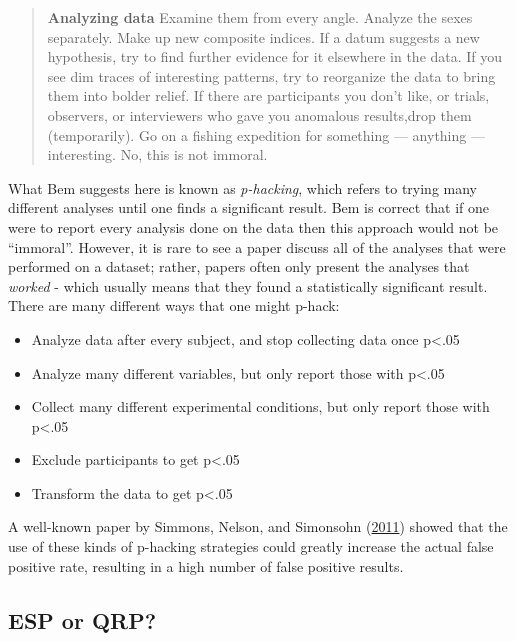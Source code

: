 \documentclass[12pt,]{book}
\providecommand{\tightlist}{%
  \setlength{\itemsep}{0pt}\setlength{\parskip}{0pt}}
\theoremstyle{definition}
\theoremstyle{definition}
\theoremstyle{definition}
\theoremstyle{remark}
\begin{document}
\begin{quote}
\textbf{Analyzing data} Examine them from every angle. Analyze the sexes separately. Make up new composite indices. If a datum suggests a new hypothesis, try to find further evidence for it elsewhere in the data. If you see dim traces of interesting patterns, try to reorganize the data to bring them into bolder relief. If there are participants you don't like, or trials, observers, or interviewers who gave you anomalous results,drop them (temporarily). Go on a fishing expedition for something --- anything --- interesting. No, this is not immoral.
\end{quote}

What Bem suggests here is known as \emph{p-hacking}, which refers to trying many different analyses until one finds a significant result. Bem is correct that if one were to report every analysis done on the data then this approach would not be ``immoral''. However, it is rare to see a paper discuss all of the analyses that were performed on a dataset; rather, papers often only present the analyses that \emph{worked} - which usually means that they found a statistically significant result. There are many different ways that one might p-hack:

\begin{itemize}
\tightlist
\item
  Analyze data after every subject, and stop collecting data once p\textless{}.05
\item
  Analyze many different variables, but only report those with p\textless{}.05
\item
  Collect many different experimental conditions, but only report those with p\textless{}.05
\item
  Exclude participants to get p\textless{}.05
\item
  Transform the data to get p\textless{}.05
\end{itemize}

A well-known paper by Simmons, Nelson, and Simonsohn (\protect\hyperlink{ref-simm:nels:simo:2011}{2011}) showed that the use of these kinds of p-hacking strategies could greatly increase the actual false positive rate, resulting in a high number of false positive results.

\hypertarget{esp-or-qrp}{%
\subsection{ESP or QRP?}\label{esp-or-qrp}}
\end{document}
